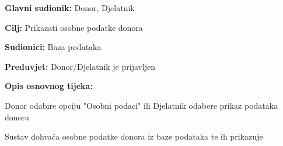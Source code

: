 \noindent {}
					\begin{packed_item}
	
						\item \textbf{Glavni sudionik: }Donor, Djelatnik
						\item \textbf{Cilj:} Prikazati osobne podatke donora
						\item \textbf{Sudionici:} Baza podataka
						\item \textbf{Preduvjet:} Donor/Djelatnik je prijavljen
						\item \textbf{Opis osnovnog tijeka:}
						
						\item[] \begin{packed_enum}
	
							\item Donor odabire opciju "Osobni podaci" ili Djelatnik odabere prikaz podataka donora
							\item Sustav dohvaća osobne podatke donora iz baze podataka te ih prikazuje
							
						\end{packed_enum}

					\end{packed_item}
\eject 
\noindent {}

